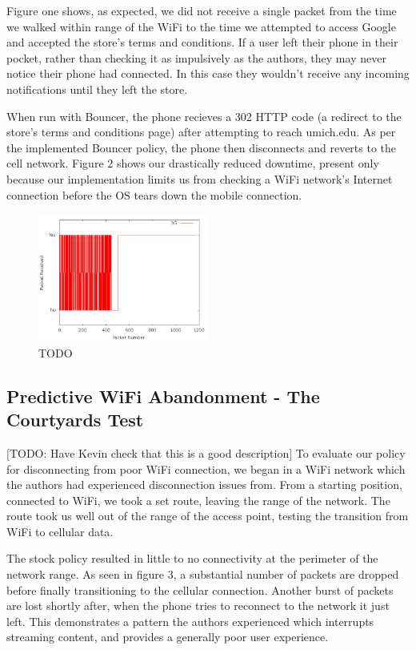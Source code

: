 Figure one shows, as expected, we did not receive a single packet from the time we walked within range of the WiFi to the time we attempted to access Google and accepted the store's terms and conditions. If a user left their phone in their pocket, rather than checking it as impulsively as the authors, they may never notice their phone had connected. In this case they wouldn't receive any incoming notifications until they left the store.

When run with Bouncer, the phone recieves a 302 HTTP code (a redirect to the store's terms and conditions page) after attempting to reach umich.edu. As per the implemented Bouncer policy, the phone then disconnects and reverts to the cell network. Figure 2 shows our drastically reduced downtime, present only because our implementation limits us from checking a WiFi network's Internet connection before the OS tears down the mobile connection.

\begin{figure}
	\includegraphics[width=0.5\textwidth]{paneraWithPolicy}
	\caption{TODO}
\end{figure}

\subsection{Predictive WiFi Abandonment - The Courtyards Test}
[TODO: Have Kevin check that this is a good description]
To evaluate our policy for disconnecting from poor WiFi connection, we began in a WiFi network which the authors had experienced disconnection issues from. From a starting position, connected to WiFi, we took a set route, leaving the range of the network. The route took us well out of the range of the access point, testing the transition from WiFi to cellular data.

The stock policy resulted in little to no connectivity at the perimeter of the network range. As seen in figure 3, a substantial number of packets are dropped before finally transitioning to the cellular connection. Another burst of packets are lost shortly after, when the phone tries to reconnect to the network it just left. This demonstrates a pattern the authors experienced which interrupts streaming content, and provides a generally poor user experience.

